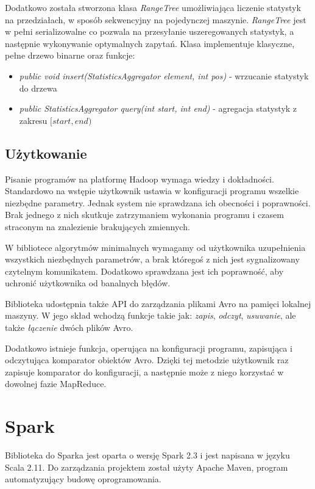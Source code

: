 \documentclass{pracamgr}
\begin{document}
Dodatkowo została stworzona klasa \textit{RangeTree} umożliwiająca liczenie statystyk na przedziałach, w sposób sekwencyjny na pojedynczej maszynie. \textit{RangeTree} jest w pełni serializowalne co pozwala na przesyłanie uszeregowanych statystyk, a następnie wykonywanie optymalnych zapytań. Klasa implementuje klasyczne, pełne drzewo binarne oraz funkcje:
\begin{itemize}
    \item \textit{public void insert(StatisticsAggregator element, int pos)} - wrzucanie statystyk do drzewa
    \item \textit{public StatisticsAggregator query(int start, int end)} - agregacja statystyk z zakresu \([start, end)\)
\end{itemize}

\subsection{Użytkowanie}

Pisanie programów na platformę Hadoop wymaga wiedzy i dokładności. Standardowo na wstępie użytkownik ustawia w konfiguracji programu wszelkie niezbędne parametry. Jednak system nie sprawdzana ich obecności i poprawności. Brak jednego z nich skutkuje zatrzymaniem wykonania programu i czasem straconym na znalezienie brakujących zmiennych.

W bibliotece algorytmów minimalnych wymagamy od użytkownika uzupełnienia wszystkich niezbędnych parametrów, a brak któregoś z nich jest sygnalizowany czytelnym komunikatem. Dodatkowo sprawdzana jest ich poprawność, aby uchronić użytkownika od banalnych błędów.

Biblioteka udostępnia także API do zarządzania plikami Avro na pamięci lokalnej maszyny. W jego skład wchodzą funkcje takie jak: \textit{zapis}, \textit{odczyt}, \textit{usuwanie}, ale także \textit{łączenie} dwóch plików Avro.

Dodatkowo istnieje funkcja, operująca na konfiguracji programu, zapisująca i odczytująca komparator obiektów Avro. Dzięki tej metodzie użytkownik raz zapisuje komparator do konfiguracji, a następnie może z niego korzystać w dowolnej fazie MapReduce.

\section{Spark}

Biblioteka do Sparka jest oparta o wersję Spark 2.3 i jest napisana w języku Scala 2.11. Do zarządzania projektem został użyty Apache Maven, program automatyzujący budowę oprogramowania.
\end{document}

